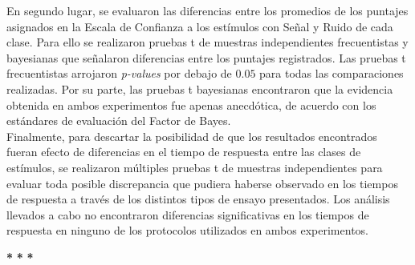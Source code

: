 En segundo lugar, se evaluaron las diferencias entre los promedios de los puntajes asignados en la Escala de Confianza a los estímulos con Señal y Ruido de cada clase. Para ello se realizaron pruebas t de muestras independientes frecuentistas y bayesianas que señalaron diferencias entre los puntajes registrados. Las pruebas t frecuentistas arrojaron \textit{p-values} por debajo de $0.05$ para todas las comparaciones realizadas. Por su parte, las pruebas t bayesianas encontraron que la evidencia obtenida en ambos experimentos fue apenas anecdótica, de acuerdo con los estándares de evaluación del Factor de Bayes.\\

Finalmente, para descartar la posibilidad de que los resultados encontrados fueran efecto de diferencias en el tiempo de respuesta entre las clases de estímulos, se realizaron múltiples pruebas t de muestras independientes para evaluar toda posible discrepancia que pudiera haberse observado en los tiempos de respuesta a través de los distintos tipos de ensayo presentados. Los análisis llevados a cabo no encontraron diferencias significativas en los tiempos de respuesta en ninguno de los protocolos utilizados en ambos experimentos.\\


\begin{center}
\textbf{*} \qquad \textbf{*} \qquad \textbf{*}
\end{center}

